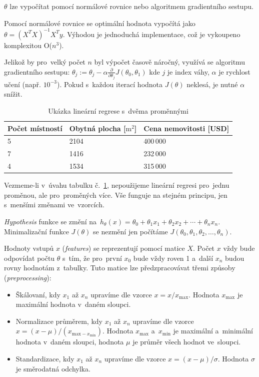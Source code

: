 $\theta$ lze vypočítat pomocí normálové rovnice nebo algoritmem gradientního sestupu.

Pomocí normálové rovnice se optimální hodnota vypočítá jako $\theta = (X^T X)^{-1} X^T y$.
Výhodou je jednoduchá implementace, což je vykoupeno komplexitou O($n^3$).

Jelikož by pro~velký počet $n$ byl výpočet časově náročný, využívá se algoritmu gradientního sestupu:
$\theta_j := \theta_j - \alpha \frac{\partial}{\partial \theta_j} J(\theta_0, \theta_1)$
kde $j$ je index váhy, $\alpha$ je rychlost učení (např. $10^{-3}$).
Pokud s~každou iterací hodnota $J(\theta)$ neklesá, je nutné $\alpha$ snížit.

\begin{table}[ht]
    \centering
    \begin{tabular}{ |l|l|l|}
        Počet místností & Obytná plocha [$\text{m}^2$] & Cena nemovitosti [USD] \\ \hline \hline
        5               & 2104                         & 400\,000               \\ \hline
        7               & 1416                         & 232\,000               \\ \hline
        4               & 1534                         & 315\,000               \\ \hline
    \end{tabular}
    \caption{Ukázka lineární regrese s~dvěma proměnnými}
    \label{upravena-tabulka-linearni-regrese}
\end{table}

Vezmeme-li v~úvahu tabulku č.~\ref{upravena-tabulka-linearni-regrese}, nepoužijeme lineární regresi pro~jednu proměnou, ale pro~proměných více.
Vše funguje na stejném principu, jen s~menšími změnami ve~vzorcích.

\emph{Hypothesis} funkce se změní na~$h_{\theta}(x) = \theta_0 + \theta_1 x_1 + \theta_2 x_2 + \dotsb + \theta_n x_n$.
Minimalizační funkce $J(\theta)$ se nezmění jen počítáme $J(\theta_0, \theta_1, \theta_2, \dots , \theta_n)$.

Hodnoty vstupů $x$ (\emph{features}) se reprezentují pomocí matice $X$.
Počet $x$ vždy bude odpovídat počtu $\theta$ s~tím, že pro~první $x_0$ bude vždy roven 1 a~další $x_n$ budou rovny hodnotám z~tabulky.
Tuto matice lze předzpracovávat třemi způsoby (\emph{preprocessing}):
\begin{itemize}
    \item
          Škálovaní, kdy $x_1$ až $x_n$ upravíme dle vzorce $x = x/x_{\text{max}}$.
          Hodnota $x_{\text{max}}$ je maximální hodnota v~daném sloupci.

    \item
          Normalizace průměrem, kdy $x_1$ až $x_n$ upravíme dle vzorce $x = (x - \mu)/(x_{\text{max} - x_{\text{min}}})$.
          Hodnota $x_{\text{max}}$ a~$x_{\text{min}}$ je maximální a~minimální hodnota v~daném sloupci, hodnota $\mu$ je průměr všech hodnot ve~sloupci.

    \item
          Standardizace, kdy $x_1$ až $x_n$ upravíme dle vzorce $x = (x - \mu)/\sigma$.
          Hodnota $\sigma$ je směrodatná odchylka.
\end{itemize}

